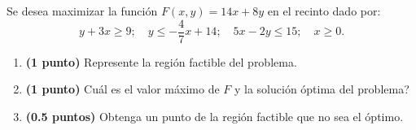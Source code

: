 
Se desea maximizar la función $F(x,y)=14x+8y$ en el recinto dado por:
\[
y+3x\geq9;\quad y\leq-\frac{4}{7}x+14;\quad5x-2y\leq15;\quad x\geq0.
\]
\begin{enumerate}[label=\alph*)]
\item \textbf{(1 punto)} Represente la región factible del problema.
\item \textbf{(1 punto)} \textquestiondown{}Cuál es el valor máximo de $F$ y la solución óptima del problema?
\item \textbf{(0.5 puntos)} Obtenga un punto de la región factible que no sea el óptimo.
\end{enumerate}
